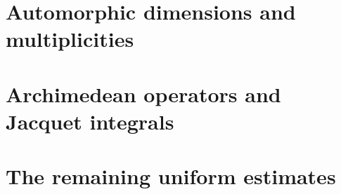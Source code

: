 \part{Automorphic dimensions and multiplicities}








\part{Archimedean operators and Jacquet integrals}





















\part{The remaining uniform estimates}
